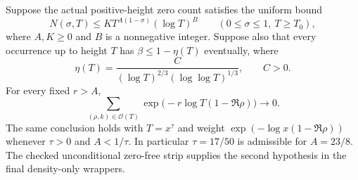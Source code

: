 \begin{lemma}
\label{analytic:weighted-zero-vanishing}
\leanok
Suppose the actual positive-height zero count satisfies the uniform bound
\[
 N(\sigma,T)\le K T^{A(1-\sigma)}(\log T)^B
 \qquad(0\le\sigma\le1,\ T\ge T_0),
\]
where $A,K\ge0$ and $B$ is a nonnegative integer.
Suppose also that every occurrence up to height $T$ has
$\beta\le1-\eta(T)$ eventually, where
\[
 \eta(T)=\frac{C}{(\log T)^{2/3}(\log\log T)^{1/3}},
 \qquad C>0.
\]
For every fixed $r>A$,
\[
 \sum_{(\rho,k)\in\mathcal O(T)}
       \exp\bigl(-r\log T(1-\Re\rho)\bigr)\longrightarrow0.
\]
The same conclusion holds with $T=x^\tau$ and weight
$\exp(-\log x(1-\Re\rho))$ whenever $\tau>0$ and $A<1/\tau$.
In particular $\tau=17/50$ is admissible for $A=23/8$.
The checked unconditional zero-free strip supplies the second
hypothesis in the final density-only wrappers.
\end{lemma}

